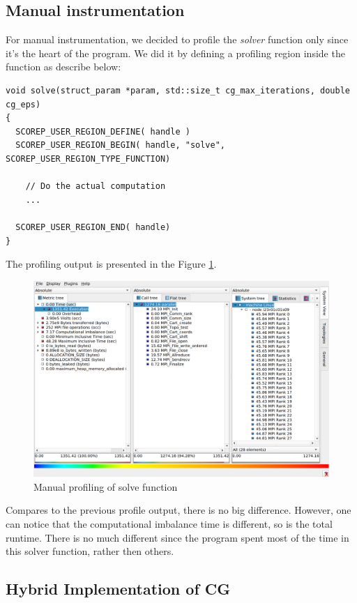 \documentclass[article]{scrartcl}
\begin{document}
\subsection{Manual instrumentation}
For manual instrumentation, we decided to profile the \textit{solver} function only since it's the heart of the program. We did it by defining a profiling region inside the function as describe below:
\begin{lstlisting}[frame=single]
void solve(struct_param *param, std::size_t cg_max_iterations, double cg_eps)    
{                                                                                                     
  SCOREP_USER_REGION_DEFINE( handle )                                          
  SCOREP_USER_REGION_BEGIN( handle, "solve", SCOREP_USER_REGION_TYPE_FUNCTION) 

    // Do the actual computation
    ...

  SCOREP_USER_REGION_END( handle)
}
\end{lstlisting}
The profiling output is presented in the Figure \ref{fig:sca_function}.
\begin{figure}[htpb]
    \centering
    \includegraphics[width=.9\textwidth,keepaspectratio=true]{../figs/3_2_Cube_Function.png}
    \caption{Manual profiling of solve function}
    \label{fig:sca_function}
\end{figure}
Compares to the previous profile output, there is no big difference. However, one can notice that the computational imbalance time is different, so is the total runtime. There is no much different since the program spent most of the time in this solver function, rather then others.

\subsection{Hybrid Implementation of CG}
\end{document}
